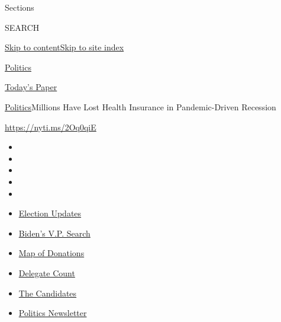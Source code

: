 Sections

SEARCH

\protect\hyperlink{site-content}{Skip to
content}\protect\hyperlink{site-index}{Skip to site index}

\href{https://www.nytimes3xbfgragh.onion/section/politics}{Politics}

\href{https://myaccount.nytimes3xbfgragh.onion/auth/login?response_type=cookie\&client_id=vi}{}

\href{https://www.nytimes3xbfgragh.onion/section/todayspaper}{Today's
Paper}

\href{/section/politics}{Politics}\textbar{}Millions Have Lost Health
Insurance in Pandemic-Driven Recession

\url{https://nyti.ms/2Oq0qiE}

\begin{itemize}
\item
\item
\item
\item
\item
\end{itemize}

\begin{itemize}
\item
  \href{https://www.nytimes3xbfgragh.onion/2020/07/31/us/elections/biden-vs-trump.html?action=click\&pgtype=Article\&state=default\&region=TOP_BANNER\&context=storylines_menu}{Election
  Updates}
\item
  \href{https://www.nytimes3xbfgragh.onion/article/biden-vice-president-2020.html?action=click\&pgtype=Article\&state=default\&region=TOP_BANNER\&context=storylines_menu}{Biden's
  V.P. Search}
\item
  \href{https://www.nytimes3xbfgragh.onion/interactive/2020/07/24/us/politics/trump-biden-campaign-donors.html?action=click\&pgtype=Article\&state=default\&region=TOP_BANNER\&context=storylines_menu}{Map
  of Donations}
\item
  \href{https://www.nytimes3xbfgragh.onion/interactive/2020/us/elections/delegate-count-primary-results.html?action=click\&pgtype=Article\&state=default\&region=TOP_BANNER\&context=storylines_menu}{Delegate
  Count}
\item
  \href{https://www.nytimes3xbfgragh.onion/interactive/2019/us/politics/2020-presidential-candidates.html?action=click\&pgtype=Article\&state=default\&region=TOP_BANNER\&context=storylines_menu}{The
  Candidates}
\item
  \href{https://www.nytimes3xbfgragh.onion/newsletters/politics?action=click\&pgtype=Article\&state=default\&region=TOP_BANNER\&context=storylines_menu}{Politics
  Newsletter}
\end{itemize}

